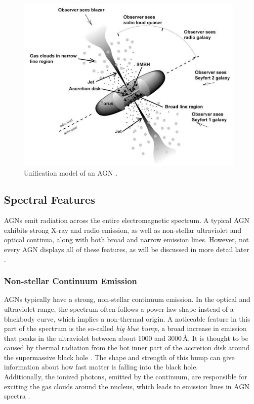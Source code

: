 \begin{figure}[!ht]
	\centering
	\includegraphics[width=\textwidth]{pictures/Chapter2/AGN_unified_model.jpg}
	\caption{Unification model of an AGN \parencite{fermi2025figure1}.}
	\label{fig:agn_sed}
\end{figure}



\subsection{Spectral Features}
\label{sec:spectral_features}

AGNs emit radiation across the entire electromagnetic spectrum. A typical AGN exhibits strong X-ray and radio emission, as well as non-stellar ultraviolet and optical continua, along with both broad and narrow emission lines. However, not every AGN displays all of these features, as will be discussed in more detail later \parencite{peterson1997introduction}.
\subsubsection{Non-stellar Continuum Emission}
AGNs typically have a strong, non-stellar continuum emission. In the optical and ultraviolet range, the spectrum often follows a power-law shape instead of a blackbody curve, which implies a non-thermal origin. A noticeable feature in this part of the spectrum is the so-called \emph{big blue bump}, a broad increase in emission that peaks in the ultraviolet between about 1000 and 3000\,\AA. It is thought to be caused by thermal radiation from the hot inner part of the accretion disk around the supermassive black hole \parencite{peterson1997introduction, osterbrock1989agn}. The shape and strength of this bump can give information about how fast matter is falling into the black hole. \\
Additionally, the ionized photons, emitted by the continuum, are responsible for exciting the gas clouds around the nucleus, which leads to emission lines in AGN spectra \parencite{osterbrock1989agn}.

